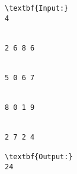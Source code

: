 \begin{verbatim}
\textbf{Input:}
4


2 6 8 6 


5 0 6 7 


8 0 1 9 


2 7 2 4

\textbf{Output:}
24


\end{verbatim}